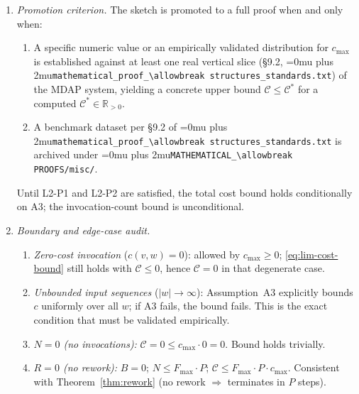 \documentclass[12pt]{article}
\theoremstyle{definition}
\DeclareRobustCommand{\code}[1]{\begingroup\Urlmuskip=0mu plus 2mu\relax\nolinkurl{#1}\endgroup}
\newcommand{\ProofStd}{\code{mathematical\_proof\_\allowbreak structures\_standards.txt}}
\begin{document}
\begin{enumerate}
    \item \emph{Promotion criterion.}
          The sketch is promoted to a full proof when and only when:
          \begin{enumerate}
              \item[L2-P1] A specific numeric value or an empirically
                           validated distribution for $c_{\max}$ is
                           established against at least one real vertical
                           slice (\S9.2, \ProofStd{}) of the MDAP system,
                           yielding a concrete upper bound
                           $\mathcal{C} \leq \mathcal{C}^{*}$ for a
                           computed $\mathcal{C}^{*} \in \mathbb{R}_{>0}$.
              \item[L2-P2] A benchmark dataset per \S9.2 of \ProofStd{}
                           is archived under
                           \code{MATHEMATICAL\_\allowbreak PROOFS/misc/}.
          \end{enumerate}
          Until L2-P1 and L2-P2 are satisfied, the total cost bound
          holds conditionally on A3; the invocation-count bound is
          unconditional.

    \item \emph{Boundary and edge-case audit.}
          \begin{enumerate}
              \item[L2-E1] \emph{Zero-cost invocation} ($c(v,w) = 0$):
                           allowed by $c_{\max} \geq 0$;
                           \eqref{eq:lim-cost-bound} still holds with
                           $\mathcal{C} \leq 0$, hence $\mathcal{C} = 0$
                           in that degenerate case.
              \item[L2-E2] \emph{Unbounded input sequences} ($|w|
                           \to \infty$): Assumption~A3 explicitly
                           bounds $c$ uniformly over all $w$; if A3
                           fails, the bound fails.  This is the exact
                           condition that must be validated empirically.
              \item[L2-E3] \emph{$N = 0$ (no invocations):}
                           $\mathcal{C} = 0 \leq c_{\max} \cdot 0 = 0$.
                           Bound holds trivially.
              \item[L2-E4] \emph{$R = 0$ (no rework):}
                           $B = 0$; $N \leq F_{\max} \cdot P$;
                           $\mathcal{C} \leq F_{\max} \cdot P \cdot
                           c_{\max}$.  Consistent with
                           Theorem~\ref{thm:rework} (no rework
                           $\Rightarrow$ terminates in $P$ steps).
          \end{enumerate}


\end{enumerate}
\end{document}
